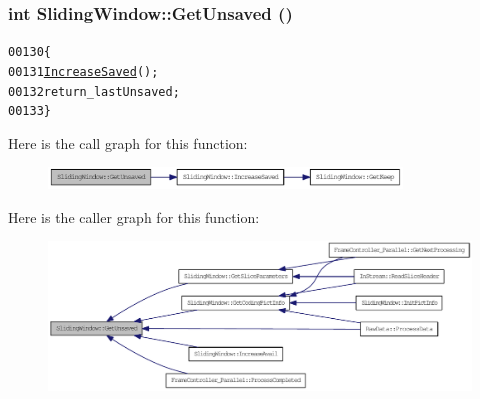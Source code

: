 \hypertarget{class_sliding_window_a3df64e20282ce10a45c4c3f3011e536d}{
\subsubsection[{GetUnsaved}]{\setlength{\rightskip}{0pt plus 5cm}int SlidingWindow::GetUnsaved ()}}
\label{class_sliding_window_a3df64e20282ce10a45c4c3f3011e536d}




\begin{footnotesize}\begin{alltt}
00130         \{
00131                 \hyperlink{class_sliding_window_aea027ce6f77dcee09d1aafb31d5732c5}{IncreaseSaved}();
00132                 \textcolor{keywordflow}{return} \_lastUnsaved;
00133         \}
\end{alltt}\end{footnotesize}




Here is the call graph for this function:\nopagebreak
\begin{figure}[H]
\begin{center}
\leavevmode
\includegraphics[width=266pt]{class_sliding_window_a3df64e20282ce10a45c4c3f3011e536d_cgraph}
\end{center}
\end{figure}




Here is the caller graph for this function:\nopagebreak
\begin{figure}[H]
\begin{center}
\leavevmode
\includegraphics[width=341pt]{class_sliding_window_a3df64e20282ce10a45c4c3f3011e536d_icgraph}
\end{center}
\end{figure}


